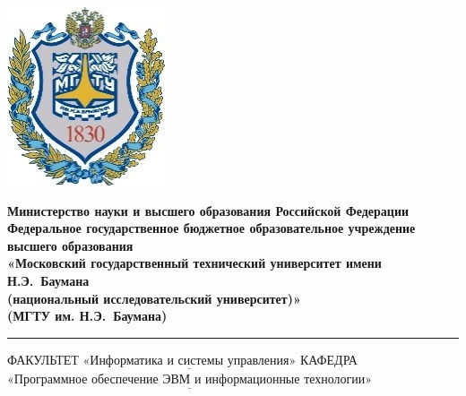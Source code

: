 \documentclass[12pt,a4paper,oneside]{report}
\begin{document}
	
\noindent \begin{minipage}{0.15\textwidth}
	\includegraphics[width=\linewidth]{b_logo}
\end{minipage}
\noindent\begin{minipage}{0.9\textwidth}\centering
	\textbf{Министерство науки и высшего образования Российской Федерации}\\
	\textbf{Федеральное государственное бюджетное образовательное учреждение высшего образования}\\
	\textbf{«Московский государственный технический университет имени Н.Э.~Баумана}\\
	\textbf{(национальный исследовательский университет)»}\\
	\textbf{(МГТУ им. Н.Э.~Баумана)}
\end{minipage}

\noindent\rule{18cm}{3pt}
\newline
\noindent ФАКУЛЬТЕТ $\underline{\text{«Информатика и системы управления»}}$ \newline
\noindent КАФЕДРА $\underline{\text{«Программное обеспечение ЭВМ и информационные технологии»}}$\newline
\end{document}
